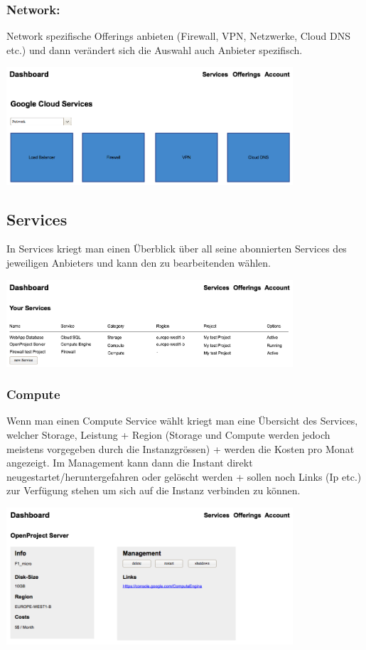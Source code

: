 \documentclass[11pt]{scrartcl}
\begin{document}
\subsubsection{Network:}
Network spezifische Offerings anbieten (Firewall, VPN, Netzwerke, Cloud DNS etc.) 
und dann verändert sich die Auswahl auch Anbieter spezifisch.

  \includegraphics[width=0.8\textwidth]{homescreen_google_network}




\subsection{Services}
In Services kriegt man einen Überblick über all seine abonnierten Services des jeweiligen 
Anbieters und kann den zu bearbeitenden wählen.

\includegraphics[width=0.8\textwidth]{services_overview}


\subsubsection{Compute}
Wenn man einen Compute Service wählt kriegt man eine Übersicht des Services, 
welcher Storage, Leistung + Region (Storage und Compute werden jedoch 
meistens vorgegeben durch die Instanzgrössen) + werden die Kosten pro 
Monat angezeigt.
Im Management kann dann die Instant direkt neugestartet/heruntergefahren oder gelöscht 
werden + sollen noch Links (Ip etc.) zur Verfügung stehen um sich auf die Instanz 
 verbinden zu können.

\includegraphics[width=0.8\textwidth]{service_info_compute}
\end{document}
